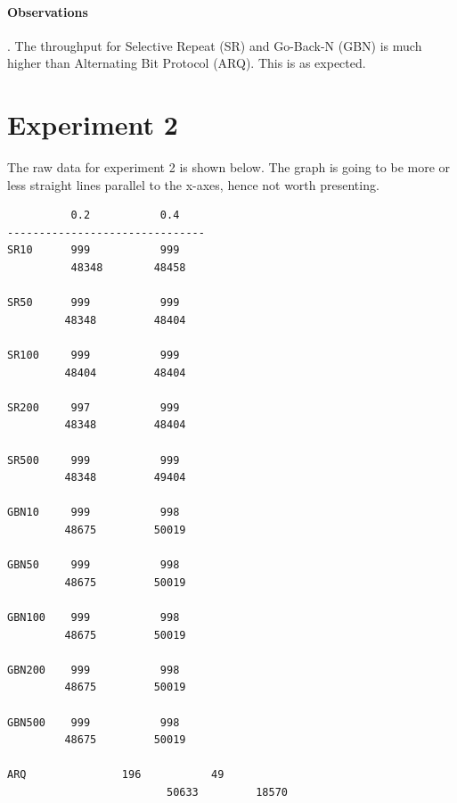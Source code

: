 \paragraph{Observations}. The throughput for Selective Repeat (SR) and
Go-Back-N (GBN) is much higher than Alternating Bit Protocol (ARQ).
This is as expected.

\section*{Experiment 2}

The raw data for experiment 2 is shown below. The graph is going to be
more or less straight lines parallel to the x-axes, hence not worth
presenting.

\begin{verbatim}
          0.2           0.4
-------------------------------
SR10      999           999
          48348        48458     

SR50      999           999
         48348         48404

SR100     999           999
         48404         48404

SR200     997           999
         48348         48404

SR500     999           999
         48348         49404

GBN10     999           998
         48675         50019

GBN50     999           998
         48675         50019 

GBN100    999           998
         48675         50019 

GBN200    999           998
         48675         50019

GBN500    999           998
         48675         50019

ARQ			      196           49
				         50633         18570
\end{verbatim}


